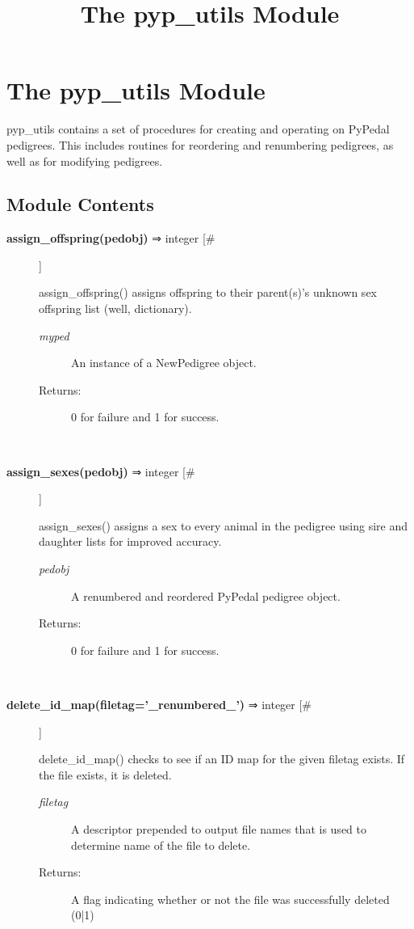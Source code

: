 \documentclass[10pt]{article}
\title{The pyp\_utils Module}
\begin{document}
\section*{The pyp\_utils Module}


 pyp\_utils contains a set of procedures for creating and operating on PyPedal pedigrees. This includes routines for reordering and renumbering pedigrees, as well as for modifying pedigrees.
\subsection*{Module Contents}
\begin{description}
\item[\textbf{assign\_offspring(pedobj)}
 ⇒ integer [\#]]

 assign\_offspring() assigns offspring to their parent(s)'s unknown sex offspring list (well, dictionary).
\begin{description}
\item[\emph{myped}
] An instance of a NewPedigree object.
\item[Returns:] 0 for failure and 1 for success.

\end{description}
\\ 

\item[\textbf{assign\_sexes(pedobj)}
 ⇒ integer [\#]]

 assign\_sexes() assigns a sex to every animal in the pedigree using sire and daughter lists for improved accuracy.
\begin{description}
\item[\emph{pedobj}
] A renumbered and reordered PyPedal pedigree object.
\item[Returns:] 0 for failure and 1 for success.

\end{description}
\\ 

\item[\textbf{delete\_id\_map(filetag='\_renumbered\_')}
 ⇒ integer [\#]]

 delete\_id\_map() checks to see if an ID map for the given filetag exists. If the file exists, it is deleted.
\begin{description}
\item[\emph{filetag}
] A descriptor prepended to output file names that is used to determine name of the file to delete.
\item[Returns:] A flag indicating whether or not the file was successfully deleted (0|1)


\end{description}
\end{description}
\end{document}
